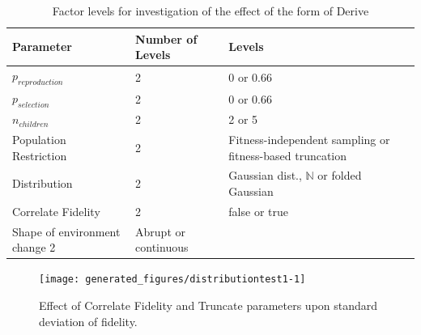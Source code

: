 \begin{table} %
	\begin{center}
		\caption{Factor levels for investigation of the effect of the form of Derive}
		\begin{tabular}{@{}llp{6cm}@{}}
			\toprule
			Parameter              & Number of Levels & Levels                                                   \\
			\midrule
			$p_{reproduction}$     & 2                & 0 or 0.66                                                \\
			$p_{selection}$        & 2                & 0 or 0.66                                                \\
			$n_{children}$         & 2                & 2 or 5                                                   \\
			Population Restriction & 2                & Fitness-independent sampling or fitness-based truncation \\
			Distribution           & 2                & Gaussian dist., $\mathbb{N}$ or folded Gaussian          \\
			Correlate Fidelity     & 2                & false or true                                            \\
			Shape of environment change		2&	Abrupt or continuous\\
			\bottomrule
		\end{tabular}
	\end{center}
\end{table}

\begin{knitrout}
\color{fgcolor}\begin{figure}[htp]
\texttt{[image: generated\_figures/distributiontest1-1]} \caption[Effect of Correlate Fidelity and Truncate parameters upon standard deviation of fidelity]{Effect of Correlate Fidelity and Truncate parameters upon standard deviation of fidelity.}\label{fig:distributiontest1}
\end{figure}


\end{knitrout}


%

